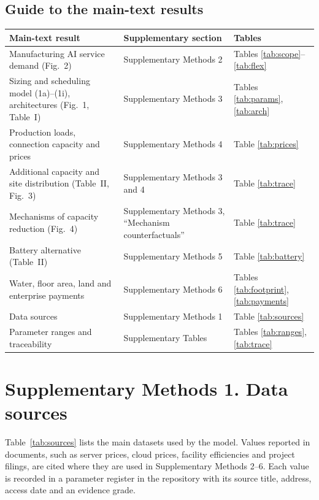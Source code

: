 \documentclass[11pt]{article}
\begin{document}
\subsection*{Guide to the main-text results}
\begin{table}[H]
\centering\small
\begin{tabular}{@{}L{0.36\textwidth}L{0.34\textwidth}L{0.24\textwidth}@{}}
\toprule
Main-text result & Supplementary section & Tables \\
\midrule
Manufacturing AI service demand (Fig.~2) & Supplementary Methods 2 & Tables \ref{tab:scope}--\ref{tab:flex} \\
Sizing and scheduling model (1a)--(1i), architectures (Fig.~1, Table~I) & Supplementary Methods 3 & Tables \ref{tab:params}, \ref{tab:arch} \\
Production loads, connection capacity and prices & Supplementary Methods 4 & Table \ref{tab:prices} \\
Additional capacity and site distribution (Table~II, Fig.~3) & Supplementary Methods 3 and 4 & Table \ref{tab:trace} \\
Mechanisms of capacity reduction (Fig.~4) & Supplementary Methods 3, ``Mechanism counterfactuals'' & Table \ref{tab:trace} \\
Battery alternative (Table~II) & Supplementary Methods 5 & Table \ref{tab:battery} \\
Water, floor area, land and enterprise payments & Supplementary Methods 6 & Tables \ref{tab:footprint}, \ref{tab:payments} \\
Data sources & Supplementary Methods 1 & Table \ref{tab:sources} \\
Parameter ranges and traceability & Supplementary Tables & Tables \ref{tab:ranges}, \ref{tab:trace} \\
\bottomrule
\end{tabular}
\end{table}
\setcounter{table}{0}      %

\clearpage
\section*{Supplementary Methods 1. Data sources}

Table~\ref{tab:sources} lists the main datasets used by the model. Values reported in documents, such as server prices, cloud prices, facility efficiencies and project filings, are cited where they are used in Supplementary Methods 2--6. Each value is recorded in a parameter register in the repository with its source title, address, access date and an evidence grade.
\end{document}
